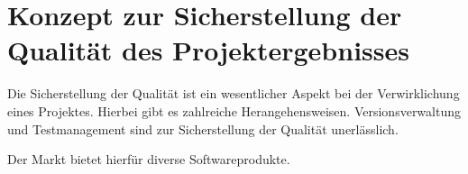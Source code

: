 \documentclass[]{article}
\begin{document}
	\section{Konzept zur Sicherstellung der Qualität des Projektergebnisses}
	
	Die Sicherstellung der Qualität ist ein wesentlicher Aspekt bei der Verwirklichung eines Projektes. Hierbei gibt es zahlreiche Herangehensweisen. Versionsverwaltung und Testmanagement sind zur Sicherstellung der Qualität unerlässlich. 
	
	 Der Markt bietet hierfür diverse Softwareprodukte. 
	
\end{document}
